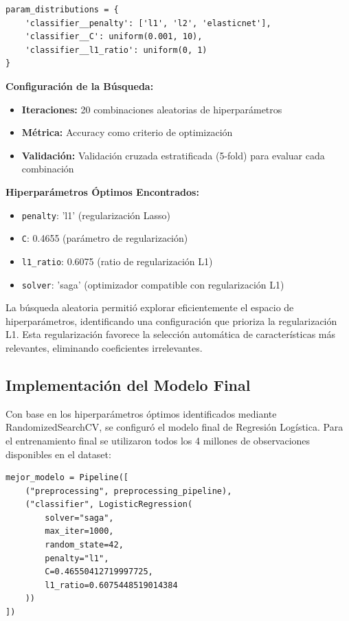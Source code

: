 \documentclass{article}
\begin{document}
\begin{verbatim}
param_distributions = {
    'classifier__penalty': ['l1', 'l2', 'elasticnet'],
    'classifier__C': uniform(0.001, 10),
    'classifier__l1_ratio': uniform(0, 1)
}
\end{verbatim}

\textbf{Configuración de la Búsqueda:}
\begin{itemize}
    \item \textbf{Iteraciones:} 20 combinaciones aleatorias de hiperparámetros
    \item \textbf{Métrica:} Accuracy como criterio de optimización
    \item \textbf{Validación:} Validación cruzada estratificada (5-fold) para evaluar cada combinación
\end{itemize}

\textbf{Hiperparámetros Óptimos Encontrados:}
\begin{itemize}
    \item \texttt{penalty}: 'l1' (regularización Lasso)
    \item \texttt{C}: 0.4655 (parámetro de regularización)
    \item \texttt{l1\_ratio}: 0.6075 (ratio de regularización L1)
    \item \texttt{solver}: 'saga' (optimizador compatible con regularización L1)
\end{itemize}

La búsqueda aleatoria permitió explorar eficientemente el espacio de hiperparámetros, identificando una configuración que prioriza la regularización L1. Esta regularización favorece la selección automática de características más relevantes, eliminando coeficientes irrelevantes.

\subsection{Implementación del Modelo Final}

Con base en los hiperparámetros óptimos identificados mediante RandomizedSearchCV, se configuró el modelo final de Regresión Logística. Para el entrenamiento final se utilizaron todos los 4 millones de observaciones disponibles en el dataset:

\begin{verbatim}
mejor_modelo = Pipeline([
    ("preprocessing", preprocessing_pipeline),
    ("classifier", LogisticRegression(
        solver="saga",
        max_iter=1000,
        random_state=42,
        penalty="l1",
        C=0.46550412719997725,
        l1_ratio=0.6075448519014384
    ))
])
\end{verbatim}
\end{document}
